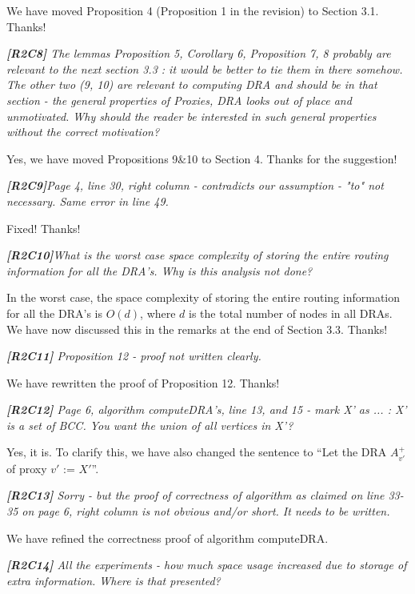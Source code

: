 \documentclass[11pt]{letter}
\newcommand{\vs}{\vspace{1ex}}
\newcommand{\svs}{\vspace{0.36ex}}
\begin{document}
We have moved Proposition 4 (Proposition 1 in the revision) to Section 3.1. Thanks!

\vs
\noindent
{\em{\bf[R2C8]} The lemmas Proposition 5, Corollary 6, Proposition 7, 8 probably
are relevant to the next section 3.3 : it would be better to tie them
in there somehow. The other two (9, 10) are relevant to computing DRA
and should be in that section - the general properties of Proxies, DRA
looks out of place and unmotivated. Why should the reader be
interested
in such general properties without the correct motivation?
}

\svs
Yes, we have moved Propositions 9\&10 to Section 4. Thanks for the suggestion!

\vs
\noindent
{\em{\bf[R2C9]}Page 4, line 30, right column - contradicts our assumption - "to" not necessary. Same error in line 49.}
\svs

Fixed! Thanks!

\vs
\noindent
{\em{\bf[R2C10]}What is the worst case space complexity of storing the entire routing information for all the DRA's. Why is this analysis not done?}
\svs

In the worst case, the space complexity of storing the entire routing information for all the DRA's is $O(d)$, where $d$ is the total number of nodes in all DRAs. We have now discussed this in the remarks at the end of Section 3.3. Thanks!



\vs
\noindent
{\em{\bf[R2C11]} Proposition 12 - proof not written clearly.}

\svs
We have rewritten the proof of Proposition 12. Thanks!

\vs
\noindent
{\em{\bf[R2C12]} Page 6, algorithm computeDRA's, line 13, and 15 - mark X' as ... : X' is a set of BCC. You want the union of all vertices in X'?}
\svs

Yes, it is. To clarify this, we have also changed the sentence to ``Let the DRA $A^+_{v'}$ of proxy $v'$ := $X'$''.


\vs
\noindent
{\em{\bf[R2C13]} Sorry - but the proof of correctness of algorithm as claimed on line 33-35 on page 6, right column is not obvious and/or short. It needs to be written.}

\svs
We have refined the correctness proof of algorithm computeDRA.


\vs
\noindent
{\em{\bf[R2C14]} All the experiments - how much space usage increased due to storage of extra information. Where is that presented?}
\end{document}
